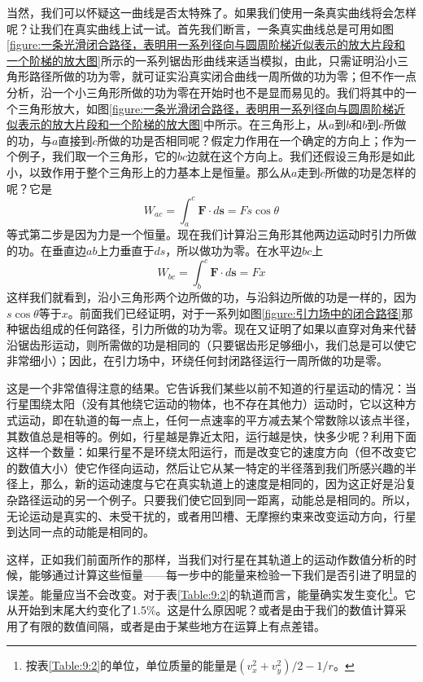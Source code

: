 当然，我们可以怀疑这一曲线是否太特殊了。如果我们使用一条真实曲线将会怎样呢？让我们在真实曲线上试一试。首先我们断言，一条真实曲线总是可用如图\ref{figure:一条光滑闭合路径，表明用一系列径向与圆周阶梯近似表示的放大片段和一个阶梯的放大图}所示的一系列锯齿形曲线来适当模拟，由此，只需证明沿小三角形路径所做的功为零，就可证实沿真实闭合曲线一周所做的功为零；但不作一点分析，沿一个小三角形所做的功为零在开始时也不是显而易见的。我们将其中的一个三角形放大，如图\ref{figure:一条光滑闭合路径，表明用一系列径向与圆周阶梯近似表示的放大片段和一个阶梯的放大图}中所示。在三角形上，从$a$到$b$和$b$到$c$所做的功，与$a$直接到$c$所做的功是否相同呢？假定力作用在一个确定的方向上；作为一个例子，我们取一个三角形，它的$bc$边就在这个方向上。我们还假设三角形是如此小，以致作用于整个三角形上的力基本上是恒量。那么从$a$走到$c$所做的功是怎样的呢？它是
\begin{equation*}
    W_{ac}=\int_{a}^{c} \boldsymbol{F} \cdot d\boldsymbol{s} = Fs \cos\theta
\end{equation*}
等式第二步是因为力是一个恒量。现在我们计算沿三角形其他两边运动时引力所做的功。在垂直边$ab$上力垂直于$ds$，所以做功为零。在水平边$bc$上
\begin{equation*}
    W_{bc}=\int_{b}^{c} \boldsymbol{F} \cdot d\boldsymbol{s} = Fx
\end{equation*}
这样我们就看到，沿小三角形两个边所做的功，与沿斜边所做的功是一样的，因为$s\cos \theta$等于$x$。前面我们已经证明，对于一系列如图\ref{figure:引力场中的闭合路径}那种锯齿组成的任何路径，引力所做的功为零。现在又证明了如果以直穿对角来代替沿锯齿形运动，则所需做的功是相同的（只要锯齿形足够细小，我们总是可以使它非常细小）；因此，在引力场中，环绕任何封闭路径运行一周所做的功是零。

这是一个非常值得注意的结果。它告诉我们某些以前不知道的行星运动的情况：当行星围绕太阳（没有其他绕它运动的物体，也不存在其他力）运动时，它以这种方式运动，即在轨道的每一点上，任何一点速率的平方减去某个常数除以该点半径，其数值总是相等的。例如，行星越是靠近太阳，运行越是快，快多少呢？利用下面这样一个数量：如果行星不是环绕太阳运行，而是改变它的速度方向（但不改变它的数值大小）使它作径向运动，然后让它从某一特定的半径落到我们所感兴趣的半径上，那么，新的运动速度与它在真实轨道上的速度是相同的，因为这正好是沿复杂路径运动的另一个例子。只要我们使它回到同一距离，动能总是相同的。所以，无论运动是真实的、未受干扰的，或者用凹槽、无摩擦约束来改变运动方向，行星到达同一点的动能是相同的。

这样，正如我们前面所作的那样，当我们对行星在其轨道上的运动作数值分析的时候，能够通过计算这些恒量——每一步中的能量来检验一下我们是否引进了明显的误差。能量应当不会改变。对于表\ref{Table:9:2}的轨道而言，能量确实发生变化\footnote{按表\ref{Table:9:2}的单位，单位质量的能量是$(v_x^2+v_y^2)/2-1/r$。}。它从开始到末尾大约变化了1.5\%。这是什么原因呢？或者是由于我们的数值计算采用了有限的数值间隔，或者是由于某些地方在运算上有点差错。

